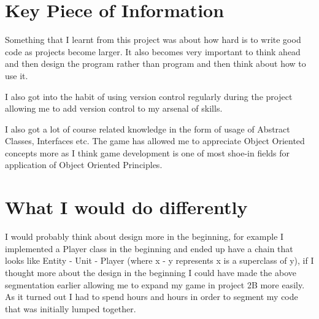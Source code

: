 \documentclass[a4paper]{article}
\begin{document}
\section{Key Piece of Information}

Something that I learnt from this project was about how hard is to write good code as projects become larger. It also becomes very important to think ahead and then design the program rather than program and then think about how to use it.

I also got into the habit of using version control regularly during the project allowing me to add version control to my arsenal of skills. 

I also got a lot of course related knowledge in the form of usage of Abstract Classes, Interfaces etc. The game has allowed me to appreciate Object Oriented concepts more as I think game development is one of most shoe-in fields for application of Object Oriented Principles. 


\section{What I would do differently}

I would probably think about design more in the beginning, for example I implemented a Player class in the beginning and ended up have a chain that looks like Entity - Unit - Player (where x - y represents x is a superclass of y), if I thought more about the design in the beginning I could have made the above segmentation earlier allowing me to expand my game in project 2B more easily. As it turned out I had to spend hours and hours in order to segment my code that was initially lumped together.
\end{document}
